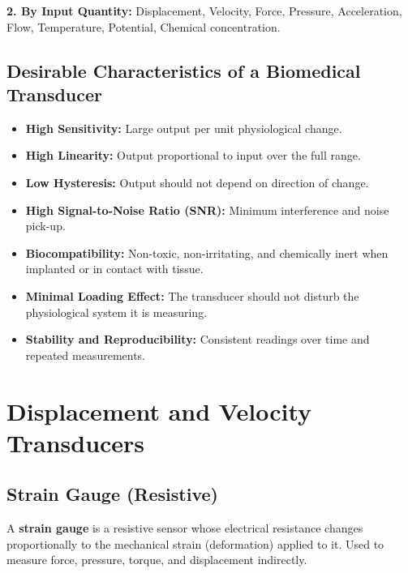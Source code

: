 \documentclass[12pt,a4paper]{article}
\begin{document}
\textbf{2. By Input Quantity:} Displacement, Velocity, Force, Pressure, Acceleration, Flow, Temperature, Potential, Chemical concentration.

\subsection{Desirable Characteristics of a Biomedical Transducer}

\begin{itemize}[leftmargin=*, itemsep=3pt]
  \item \textbf{High Sensitivity:} Large output per unit physiological change.
  \item \textbf{High Linearity:} Output proportional to input over the full range.
  \item \textbf{Low Hysteresis:} Output should not depend on direction of change.
  \item \textbf{High Signal-to-Noise Ratio (SNR):} Minimum interference and noise pick-up.
  \item \textbf{Biocompatibility:} Non-toxic, non-irritating, and chemically inert when implanted or in contact with tissue.
  \item \textbf{Minimal Loading Effect:} The transducer should not disturb the physiological system it is measuring.
  \item \textbf{Stability and Reproducibility:} Consistent readings over time and repeated measurements.
\end{itemize}

\section{Displacement and Velocity Transducers}

\subsection{Strain Gauge (Resistive)}

\begin{tcolorbox}[defbox, title={\textbf{Strain Gauge}}]
A \textbf{strain gauge} is a resistive sensor whose electrical resistance changes proportionally to the mechanical strain (deformation) applied to it. Used to measure force, pressure, torque, and displacement indirectly.
\end{tcolorbox}
\end{document}
